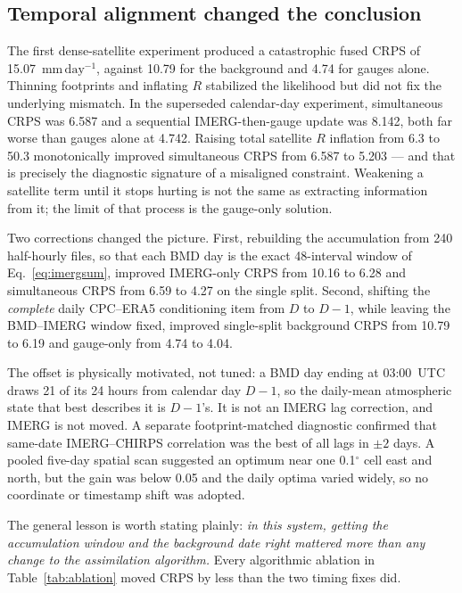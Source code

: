 \documentclass[10pt,twocolumn]{article}
\newcommand{\mmday}{\mathrm{mm\,day^{-1}}}
\begin{document}
\subsection{Temporal alignment changed the conclusion}
\label{sec:timing}

The first dense-satellite experiment produced a catastrophic fused CRPS of
15.07~$\mmday$, against 10.79 for the background and 4.74 for gauges alone.
Thinning footprints and inflating $R$ stabilized the likelihood but did not
fix the underlying mismatch. In the superseded calendar-day experiment,
simultaneous CRPS was 6.587 and a sequential IMERG-then-gauge update was
8.142, both far worse than gauges alone at 4.742. Raising total satellite $R$
inflation from 6.3 to 50.3 monotonically improved simultaneous CRPS from 6.587
to 5.203 --- and that is precisely the diagnostic signature of a misaligned
constraint. Weakening a satellite term until it stops hurting is not the same
as extracting information from it; the limit of that process is the gauge-only
solution.

Two corrections changed the picture. First, rebuilding the accumulation from
240 half-hourly files, so that each BMD day is the exact 48-interval window of
Eq.~\eqref{eq:imergsum}, improved IMERG-only CRPS from 10.16 to 6.28 and
simultaneous CRPS from 6.59 to 4.27 on the single split. Second, shifting the
\emph{complete} daily CPC--ERA5 conditioning item from $D$ to $D-1$, while
leaving the BMD--IMERG window fixed, improved single-split background CRPS
from 10.79 to 6.19 and gauge-only from 4.74 to 4.04.

The offset is physically motivated, not tuned: a BMD day ending at 03:00~UTC
draws 21 of its 24 hours from calendar day $D-1$, so the daily-mean
atmospheric state that best describes it is $D-1$'s. It is not an IMERG lag
correction, and IMERG is not moved. A separate footprint-matched diagnostic
confirmed that same-date IMERG--CHIRPS correlation was the best of all lags in
$\pm2$ days. A pooled five-day spatial scan suggested an optimum near one
0.1$^\circ$ cell east and north, but the gain was below 0.05 and the daily
optima varied widely, so no coordinate or timestamp shift was adopted.

The general lesson is worth stating plainly: \emph{in this system, getting the
accumulation window and the background date right mattered more than any
change to the assimilation algorithm.} Every algorithmic ablation in
Table~\ref{tab:ablation} moved CRPS by less than the two timing fixes did.
\end{document}
